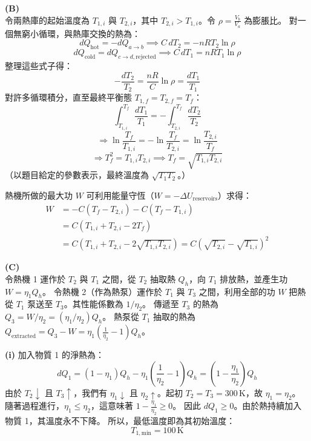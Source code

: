 \vspace{1em}
\textbf{(B)} \\
令兩熱庫的起始溫度為 $T_{1,i}$ 與 $T_{2,i}$，其中 $T_{2,i} > T_{1,i}$。令 $\rho = \frac{V_b}{V_a}$ 為膨脹比。
對一個無窮小循環，與熱庫交換的熱為：
\[ dQ_{\text{hot}} = -dQ_{a \to b} \implies C\,dT_2 = -nR T_2 \ln \rho \]
\[ dQ_{\text{cold}} = dQ_{c \to d, \text{rejected}} \implies C\,dT_1 = nR T_1 \ln \rho \]
整理這些式子得：
\[ -\frac{dT_2}{T_2} = \frac{nR}{C}\ln \rho = \frac{dT_1}{T_1} \]
對許多循環積分，直至最終平衡態 $T_{1,f} = T_{2,f} = T_f$：
\[ \int_{T_{1,i}}^{T_f} \frac{dT_1}{T_1} = -\int_{T_{2,i}}^{T_f} \frac{dT_2}{T_2} \]
\[ \Rightarrow \ln \frac{T_f}{T_{1,i}} = -\ln \frac{T_f}{T_{2,i}} = \ln \frac{T_{2,i}}{T_f} \]
\[ \Rightarrow T_f^2 = T_{1,i} T_{2,i} \implies T_f = \sqrt{T_{1,i} T_{2,i}} \]
（以題目給定的參數表示，最終溫度為 $\sqrt{T_1 T_2}$。）

熱機所做的最大功 $W$ 可利用能量守恆（$W = -\Delta U_{\text{reservoirs}}$）求得：
\begin{align*}
W &= -C(T_f - T_{2,i}) - C(T_f - T_{1,i}) \\
  &= C(T_{1,i} + T_{2,i} - 2T_f) \\
  &= C\left(T_{1,i} + T_{2,i} - 2\sqrt{T_{1,i}T_{2,i}}\right) = C\left(\sqrt{T_{2,i}} - \sqrt{T_{1,i}}\right)^2
\end{align*}

\vspace{1em}
\textbf{(C)} \\
令熱機 1 運作於 $T_2$ 與 $T_1$ 之間，從 $T_2$ 抽取熱 $Q_h$，向 $T_1$ 排放熱，並產生功 $W = \eta_1 Q_h$。
令熱機 2（作為熱泵）運作於 $T_1$ 與 $T_3$ 之間，利用全部的功 $W$ 把熱從 $T_1$ 泵送至 $T_3$。其性能係數為 $1/\eta_2$。
傳遞至 $T_3$ 的熱為 $Q_3 = W/\eta_2 = (\eta_1/\eta_2)Q_h$。
熱泵從 $T_1$ 抽取的熱為 $Q_{\text{extracted}} = Q_3 - W = \eta_1\left(\frac{1}{\eta_2}-1\right)Q_h$。

\textbf{(i)} 加入物質 1 的淨熱為：
\[ dQ_1 = (1-\eta_1)Q_h - \eta_1\left(\frac{1}{\eta_2}-1\right)Q_h = \left(1 - \frac{\eta_1}{\eta_2}\right)Q_h \]
由於 $T_2 \downarrow$ 且 $T_3 \uparrow$，我們有 $\eta_1 \downarrow$ 且 $\eta_2 \uparrow$。起初 $T_2 = T_3 = 300\,\text{K}$，故 $\eta_1 = \eta_2$。
隨著過程進行，$\eta_1 \le \eta_2$，這意味著 $1 - \frac{\eta_1}{\eta_2} \ge 0$。
因此 $dQ_1 \ge 0$。由於熱持續加入物質 1，其溫度永不下降。
所以，最低溫度即為其初始溫度：
\[ T_{1,\text{min}} = 100\,\text{K} \]

